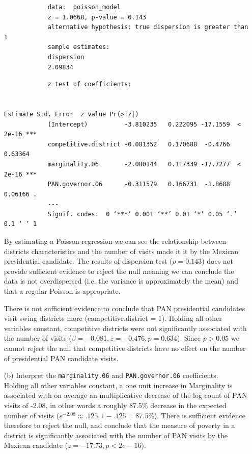 \documentclass[12pt,letterpaper]{article}
\begin{document}
\begin{enumerate}
\begin{verbatim}
			data:  poisson_model
			z = 1.0668, p-value = 0.143
			alternative hypothesis: true dispersion is greater than 1
			sample estimates:
			dispersion 
			2.09834  
		\end{verbatim}
			
		\vspace{1cm}
		
			
		\begin{verbatim}
			z test of coefficients:
			
																									Estimate Std. Error  z value Pr(>|z|)    
			(Intercept)          -3.810235   0.222095 -17.1559  < 2e-16 ***
			competitive.district -0.081352   0.170688  -0.4766  0.63364    
			marginality.06       -2.080144   0.117339 -17.7277  < 2e-16 ***
			PAN.governor.06      -0.311579   0.166731  -1.8688  0.06166 .  
			---
			Signif. codes:  0 ‘***’ 0.001 ‘**’ 0.01 ‘*’ 0.05 ‘.’ 0.1 ‘ ’ 1
		\end{verbatim}
		
		By estimating a Poisson regression we can see the relationship between districts characteristics and the number of visits made it it by the Mexican presidential candidate. The results of dispersion test ($p =0.143$) does not provide sufficient evidence to reject the null meaning we can conclude the data is not overdispersed (i.e. the variance is approximately the mean) and that a regular Poisson is appropriate. 
		
		There is not sufficient evidence to conclude that PAN presidential candidates visit swing districts more (competitive.district = 1). Holding all other variables constant, competitive districts were not significantly associated with the number of visits ($\beta = -0.081, z = -0.476, p = 0.634$). Since $p>0.05$ we cannot reject the null that competitive districts have no effect on the number of presidential PAN candidate visits.  
		 
	\item [(b)]
	Interpret the \texttt{marginality.06} and \texttt{PAN.governor.06} coefficients. \\
	
	Holding all other variables constant, a one unit increase in Marginality is associated with on average an multiplicative decrease of the log count of PAN visits of -2.08, in other words a roughly 87.5\% decrease in the expected number of visits ($e^{-2.08} \approx .125, 1-.125 = 87.5\%$). There is sufficient evidence therefore to reject the null, and conclude that the measure of poverty in a district is significantly associated with the number of PAN visits by the Mexican candidate ($ z = -17.73, p < 2e-16$).
	

\end{enumerate}
\end{document}
